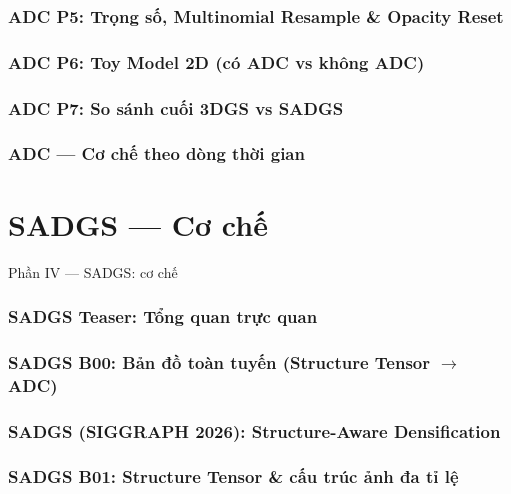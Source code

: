 \section{ADC P5: Trọng số, Multinomial Resample \& Opacity Reset}



\section{ADC P6: Toy Model 2D (có ADC vs không ADC)}


\section{ADC P7: So sánh cuối 3DGS vs SADGS}


\section{ADC --- Cơ chế theo dòng thời gian}



\part{SADGS --- Cơ chế}
\begin{frame}{Phần IV --- SADGS: cơ chế}
\small
\tableofcontents
\end{frame}

\section{SADGS Teaser: Tổng quan trực quan}


\section{SADGS B00: Bản đồ toàn tuyến (Structure Tensor $\to$ ADC)}


\section{SADGS (SIGGRAPH 2026): Structure-Aware Densification}









\section{SADGS B01: Structure Tensor \& cấu trúc ảnh đa tỉ lệ}

